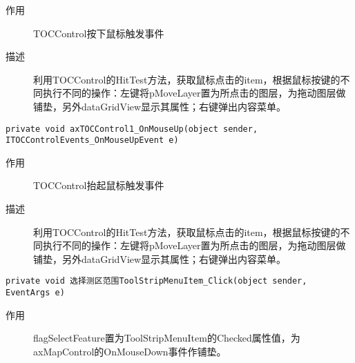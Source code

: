 \documentclass[twoside,color=blue,mathpazo,titlestyle=hang,12pt]{elegantbook}
\numberwithin{equation}{section}
\begin{document}
\begin{description}
\item[作用] TOCControl按下鼠标触发事件
\item[描述] 利用TOCControl的HitTest方法，获取鼠标点击的item，根据鼠标按键的不同执行不同的操作：左键将pMoveLayer置为所点击的图层，为拖动图层做铺垫，另外dataGridView显示其属性；右键弹出内容菜单。
\end{description}
\begin{lstlisting}
private void axTOCControl1_OnMouseUp(object sender, ITOCControlEvents_OnMouseUpEvent e)
\end{lstlisting}
\begin{description}
\item[作用] TOCControl抬起鼠标触发事件
\item[描述] 利用TOCControl的HitTest方法，获取鼠标点击的item，根据鼠标按键的不同执行不同的操作：左键将pMoveLayer置为所点击的图层，为拖动图层做铺垫，另外dataGridView显示其属性；右键弹出内容菜单。
\end{description}
\begin{lstlisting}
private void 选择测区范围ToolStripMenuItem_Click(object sender, EventArgs e)
\end{lstlisting}
\begin{description}
\item[作用] flagSelectFeature置为ToolStripMenuItem的Checked属性值，为axMapControl的OnMouseDown事件作铺垫。
\end{description}
\end{document}
